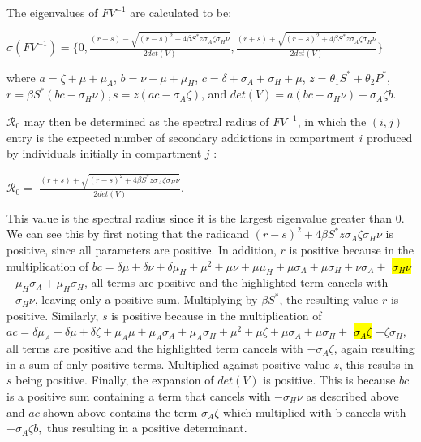 \documentclass[12pt]{article}
\begin{document}
The eigenvalues of $FV^{-1}$ are calculated to be: 
\begin{center}
$\sigma (FV^{-1}) = \{0, \frac{(r+s)-\sqrt{(r-s)^2+4\beta S^* z  \sigma_A \zeta \sigma_H \nu}}{2det(V)} 
, \frac{(r+s)+\sqrt{(r-s)^2+4\beta S^* z  \sigma_A \zeta \sigma_H \nu}}{2det(V)} 
\}$
\end{center}

where $a=\zeta +\mu + \mu_A$, $b=\nu + \mu + \mu_H$, $c=\delta + \sigma_A + \sigma_H +\mu$, $z=\theta_1 S^* + \theta_2 P^*$, $ r=\beta S^* (bc-\sigma_H \nu), s=z(ac-\sigma_{A} \zeta)$, and $det(V)=a(bc-\sigma_H\nu)-\sigma_A\zeta b$.

$\mathscr{R}_0$ may then be determined as the spectral radius of $FV^{-1}$, in which the $(i,j)$ entry is the expected number of secondary addictions in compartment $i$ produced by individuals initially in compartment $j$ :
\begin{center}
$\mathscr{R}_0=$ $\frac{(r+s)+\sqrt{(r-s)^2+4\beta S^* z  \sigma_A \zeta \sigma_H \nu}}{2det(V)}. $
\end{center}

This value is the spectral radius since it is the largest eigenvalue greater than 0. We can see this by first noting that the radicand $(r-s)^2+4\beta S^* z  \sigma_{A} \zeta \sigma_{H} \nu$ is positive, since all parameters are positive. In addition, $r$ is positive because in the multiplication of $bc=\delta \mu + \delta \nu+ \delta \mu_{H}+ \mu^{2} + \mu \nu+ \mu \mu_{H} + \mu \sigma_{A} + \mu \sigma_{H}+ \nu \sigma_{A}+$ \hl{$ \sigma_{H} \nu $} $+ \mu_{H}\sigma_{A}+\mu_{H}\sigma_{H}$, all terms are positive and the highlighted term cancels with $-\sigma_{H} \nu$, leaving only a positive sum. Multiplying by $\beta S^*$, the resulting value $r$ is positive. Similarly, $s$ is positive because in the multiplication of $ac=\delta \mu_{A} + \delta \mu + \delta \zeta + \mu_{A} \mu+ \mu_{A} \sigma_{A}+\mu_{A} \sigma_{H} +\mu^{2} +\mu \zeta+ \mu \sigma_{A}+\mu \sigma_{H}+$ \hl{$\sigma_{A} \zeta$} $+ \zeta \sigma_{H}$, all terms are positive and the highlighted term cancels with $-\sigma_{A} \zeta$, again resulting in a sum of only positive terms. Multiplied against positive value $z$, this results in $s$ being positive. Finally, the expansion of $det(V)$ is positive. This is because $bc$ is a positive sum containing a term that cancels with $-\sigma_{H} \nu$ as described above and $ac$ shown above contains the term $\sigma_{A} \zeta$ which multiplied with b cancels with $-\sigma_A\zeta b,$ thus resulting in a positive determinant. 
\end{document}
